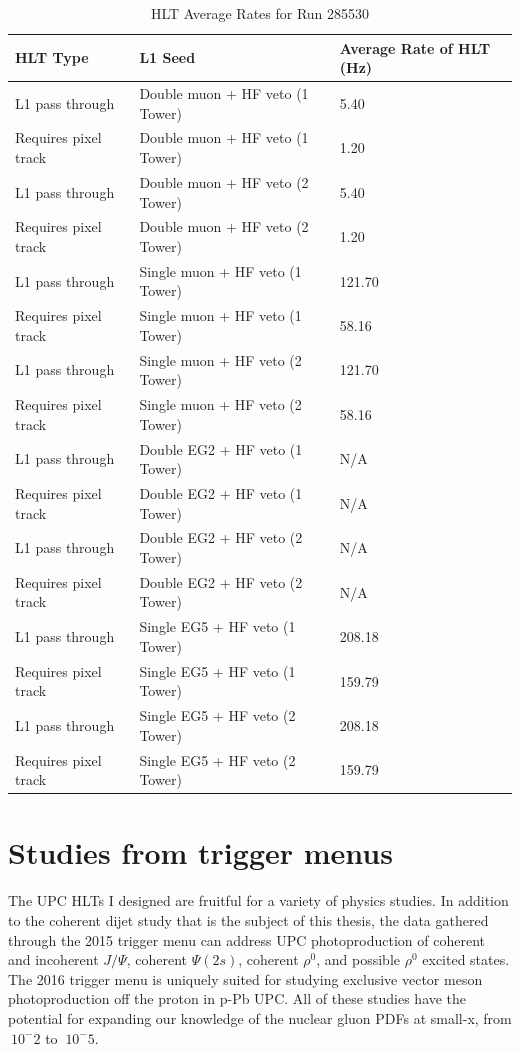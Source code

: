 \begin{table}[h!]
\centering
\caption{HLT Average Rates for Run 285530}
\label{my-label}
\begin{tabular}{@{}lll@{}}
\toprule
HLT Type             & L1 Seed                           & Average Rate of HLT (Hz) \\ \midrule
L1 pass through      & Double muon + HF veto (1 Tower) & 5.40	                    \\
Requires pixel track & Double muon + HF veto (1 Tower) & 1.20	                    \\
L1 pass through      & Double muon + HF veto (2 Tower) & 5.40                     	\\
Requires pixel track & Double muon + HF veto (2 Tower) & 1.20                     	\\
L1 pass through      & Single muon + HF veto (1 Tower) & 121.70                   	\\
Requires pixel track & Single muon + HF veto (1 Tower) & 58.16                    	\\
L1 pass through      & Single muon + HF veto (2 Tower) & 121.70	                    \\
Requires pixel track & Single muon + HF veto (2 Tower) & 58.16                    	\\
L1 pass through      & Double EG2 + HF veto (1 Tower)  & N/A                     	\\
Requires pixel track & Double EG2 + HF veto (1 Tower)  & N/A                     	\\
L1 pass through      & Double EG2 + HF veto (2 Tower)  & N/A                  		\\
Requires pixel track & Double EG2 + HF veto (2 Tower)  & N/A                     	\\ 
L1 pass through      & Single EG5 + HF veto (1 Tower)  & 208.18          			\\
Requires pixel track & Single EG5 + HF veto (1 Tower)  & 159.79                     \\
L1 pass through      & Single EG5 + HF veto (2 Tower)  & 208.18                     \\
Requires pixel track & Single EG5 + HF veto (2 Tower)  & 159.79	                    \\ \bottomrule
\end{tabular}
\end{table}

\section{Studies from trigger menus}

The UPC HLTs I designed are fruitful for a variety of physics studies. In addition to the coherent dijet study that is the subject of this thesis, the data gathered through the 2015 trigger menu can address UPC photoproduction of coherent and incoherent $J/\Psi$, coherent $\Psi(2s)$, coherent $\rho^0$, and possible $\rho^0$ excited states. The 2016 trigger menu is uniquely suited for studying exclusive vector meson photoproduction off the proton in p-Pb UPC. All of these studies have the potential for expanding our knowledge of the nuclear gluon PDFs at small-x, from $~10^-2$ to $~10^-5$.  
